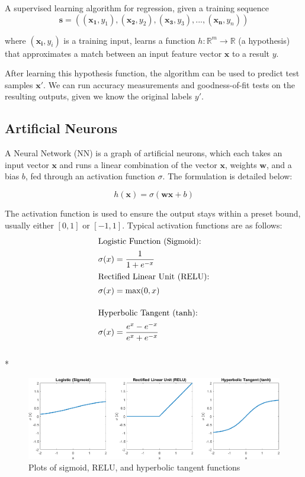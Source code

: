\documentclass[12pt,a4paper,twoside,openright]{report}
\renewcommand{\vec}[1]{\mathbf{#1}}
\newcommand{\R}{\mathbb{R}}
\begin{document}
A supervised learning algorithm for regression, given a training sequence
\begin{equation}
\vec{s} = ((\vec{x_1}, y_1), (\vec{x_2}, y_2), (\vec{x_3}, y_3), ... , (\vec{x_n}, y_n))
\end{equation}

where $(\vec{x_i}, y_i)$ is a training input, learns a function $h: \R^m \rightarrow \R$
(a hypothesis) that approximates a match between an input feature vector $\vec{x}$ to a
result $y$.

After learning this hypothesis function, the algorithm can be used to predict test
samples $\vec{x'}$. We can run accuracy measurements and goodness-of-fit tests on
the resulting outputs, given we know the original labels $y'$.

\subsection{Artificial Neurons}
\label{sec:prepNeurons}

A Neural Network (NN) is a graph of artificial neurons, which each takes an input vector $\vec{x}$
and runs a linear combination of the vector $\vec{x}$, weights $\vec{w}$, and a bias $b$,
fed through an activation function $\sigma$. The formulation is detailed below:

\begin{equation}
h(\vec{x}) = \sigma (\vec{wx} + b)
\end{equation}

The activation function is used to ensure the output stays within a preset bound,
usually either $[0,1]$ or $[-1,1]$. Typical activation functions are as follows:
\begin{align}
\intertext{Logistic Function (Sigmoid):}
&\sigma(x) = \frac{1}{1+e^{-x}}\\
\intertext{Rectified Linear Unit (RELU):}
&\sigma(x) = \text{max}(0,x)\\[10pt]
\intertext{Hyperbolic Tangent (tanh):}
&\sigma(x) = \frac{e^x - e^{-x}}{e^x + e^{-x}}
\end{align}\\*

\begin{figure}[H]
\includegraphics[width=\textwidth]{ActivationFunsCrop.png}
\caption{Plots of sigmoid, RELU, and hyperbolic tangent functions}
\end{figure}
\end{document}
